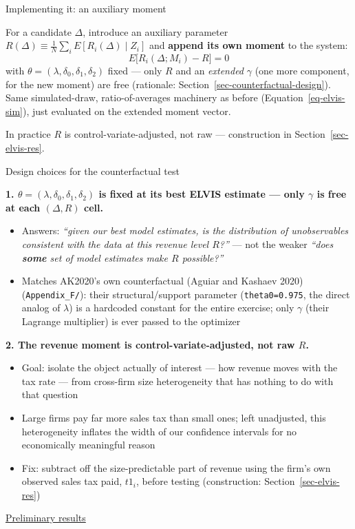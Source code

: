 \documentclass[
  ignorenonframetext,
  aspectratio=169,
]{beamer}
\providecommand{\tightlist}{%
  \setlength{\itemsep}{0pt}\setlength{\parskip}{0pt}}
\begin{document}
\begin{frame}{Implementing it: an auxiliary moment}
\protect{}\label{implementing-it-an-auxiliary-moment}
\footnotesize

For a candidate \(\Delta\), introduce an auxiliary parameter
\(R(\Delta)\equiv\frac1N\sum_iE[R_i(\Delta)\mid Z_i]\) and
\textbf{append its own moment} to the system: \[
E\big[R_i(\Delta;M_i)-R\big]=0
\] with \(\theta=(\lambda,\delta_0,\delta_1,\delta_2)\) fixed --- only
\(R\) and an \emph{extended} \(\gamma\) (one more component, for the new
moment) are free (rationale: Section~\ref{sec-counterfactual-design}).
Same simulated-draw, ratio-of-averages machinery as before
(Equation~\ref{eq-elvis-sim}), just evaluated on the extended moment
vector.

In practice \(R\) is control-variate-adjusted, not raw --- construction
in Section~\ref{sec-elvis-res}.
\end{frame}

\begin{frame}[fragile]{Design choices for the counterfactual test}
\protect{}\label{sec-counterfactual-design}
\footnotesize

\textbf{1. \(\theta=(\lambda,\delta_0,\delta_1,\delta_2)\) is fixed at
its best ELVIS estimate --- only \(\gamma\) is free at each
\((\Delta,R)\) cell.}

\begin{itemize}
\tightlist
\item
  Answers: \emph{``given our best model estimates, is the distribution
  of unobservables consistent with the data at this revenue level
  \(R\)?''} --- not the weaker \emph{``does \textbf{some} set of model
  estimates make \(R\) possible?''}
\item
  Matches AK2020's own counterfactual (Aguiar and Kashaev 2020)
  (\texttt{Appendix\_F/}): their structural/support parameter
  (\texttt{theta0=0.975}, the direct analog of \(\lambda\)) is a
  hardcoded constant for the entire exercise; only \(\gamma\) (their
  Lagrange multiplier) is ever passed to the optimizer
\end{itemize}

\textbf{2. The revenue moment is control-variate-adjusted, not raw
\(R\).}

\begin{itemize}
\tightlist
\item
  Goal: isolate the object actually of interest --- how revenue moves
  with the tax rate --- from cross-firm size heterogeneity that has
  nothing to do with that question
\item
  Large firms pay far more sales tax than small ones; left unadjusted,
  this heterogeneity inflates the width of our confidence intervals for
  no economically meaningful reason
\item
  Fix: subtract off the size-predictable part of revenue using the
  firm's own observed sales tax paid, \(t1_i\), before testing
  (construction: Section~\ref{sec-elvis-res})
\end{itemize}

\hyperlink{sec-counterfactual-results}{Preliminary results}
\end{frame}
\end{document}
